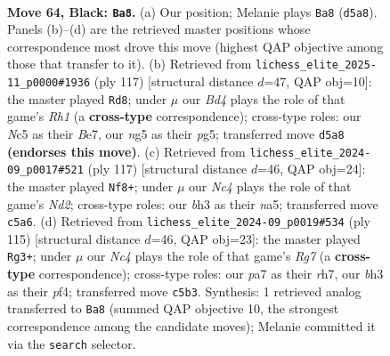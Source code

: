 \documentclass[11pt]{article}
\begin{document}
\clearpage

\begin{figure}[p]\centering
\begin{subfigure}{0.46\textwidth}\centering
\resizebox{\linewidth}{!}{%
\newchessgame
\chessboard[
  setfen={8/P7/5k2/2nb2N1/1p3P2/1P4PB/5K1P/R7 b - - 1 64},
  showmover=false,
  pgfstyle=straightmove, color=movearrow, markmove={d5-a8}
]}
\caption{}
\end{subfigure}\hfill
\begin{subfigure}{0.46\textwidth}\centering
\resizebox{\linewidth}{!}{%
\newchessgame
\chessboard[
  setfen={7r/4b3/6k1/p5P1/2B3KP/1P2P3/4R3/8 b - - 2 59},
  showmover=false,
  pgfstyle=straightmove, color=movearrow, markmove={h8-d8}
]}
\caption{}
\end{subfigure}
\\[4pt]
\begin{subfigure}{0.46\textwidth}\centering
\resizebox{\linewidth}{!}{%
\newchessgame
\chessboard[
  setfen={8/3n4/2N3KP/NP1k2P1/5p2/5P2/1b6/8 b - - 0 59},
  showmover=false,
  pgfstyle=straightmove, color=movearrow, markmove={d7-f8}
]}
\caption{}
\end{subfigure}\hfill
\begin{subfigure}{0.46\textwidth}\centering
\resizebox{\linewidth}{!}{%
\newchessgame
\chessboard[
  setfen={8/7R/2k5/2bN3P/2P2P2/1P1K4/6r1/8 b - - 4 58},
  showmover=false,
  pgfstyle=straightmove, color=movearrow, markmove={g2-g3}
]}
\caption{}
\end{subfigure}
\caption{\textbf{Move 64, Black: \texttt{Ba8}.} (a) Our position; Melanie plays \texttt{Ba8} (\texttt{d5a8}). Panels (b)--(d) are the retrieved master positions whose correspondence most drove this move (highest QAP objective among those that transfer to it). (b) Retrieved from \texttt{lichess\_elite\_2025-11\_p0000\#1936} (ply 117) [structural distance $d$=47, QAP obj=10]: the master played \texttt{Rd8}; under $\mu$ our \emph{Bd4} plays the role of that game's \emph{Rh1} (a \textbf{cross-type} correspondence); cross-type roles: our \emph{N}c5 as their \emph{B}e7, our \emph{n}g5 as their \emph{p}g5; transferred move \texttt{d5a8} \textbf{(endorses this move)}. (c) Retrieved from \texttt{lichess\_elite\_2024-09\_p0017\#521} (ply 117) [structural distance $d$=46, QAP obj=24]: the master played \texttt{Nf8+}; under $\mu$ our \emph{Nc4} plays the role of that game's \emph{Nd2}; cross-type roles: our \emph{b}h3 as their \emph{n}a5; transferred move \texttt{c5a6}. (d) Retrieved from \texttt{lichess\_elite\_2024-09\_p0019\#534} (ply 115) [structural distance $d$=46, QAP obj=23]: the master played \texttt{Rg3+}; under $\mu$ our \emph{Nc4} plays the role of that game's \emph{Rg7} (a \textbf{cross-type} correspondence); cross-type roles: our \emph{p}a7 as their \emph{r}h7, our \emph{b}h3 as their \emph{p}f4; transferred move \texttt{c5b3}. Synthesis: 1 retrieved analog transferred to \texttt{Ba8} (summed QAP objective 10, the strongest correspondence among the candidate moves); Melanie committed it via the \texttt{search} selector.}
\label{fig:thought-m127}
\end{figure}
\end{document}
